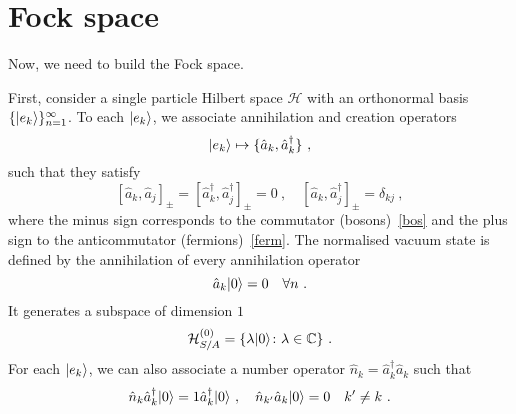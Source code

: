 \section{Fock space}

    Now, we need to build the Fock space. 
    
    First, consider a single particle Hilbert space $\mathcal H$ with an orthonormal basis $\{\vert e_k\rangle\}_{n=1}^\infty$. To each $\vert e_k\rangle$, we associate annihilation and creation operators
    \begin{equation*}
        \vert e_k\rangle \mapsto \{\hat a_k, \hat a_k^\dagger\} ~,
    \end{equation*}
    such that they satisfy
    \begin{equation}\label{comm}
        [\hat a_k, \hat a_j]_\pm = [\hat a_k^\dagger, \hat a_j^\dagger]_\pm = 0 ~, \quad [\hat a_k, \hat a_j^\dagger]_\pm = \delta_{kj} ~,
    \end{equation}
    where the minus sign corresponds to the commutator (bosons)~\eqref{bos} and the plus sign to the anticommutator (fermions)~\eqref{ferm}. The normalised vacuum state is defined by the annihilation of every annihilation operator
    \begin{equation*}
        \hat a_k \vert0\rangle = 0 \quad \forall n~.
    \end{equation*}
    It generates a subspace of dimension $1$ 
    \begin{equation}\label{vac}
        \mathcal H^{(0)}_{S/A} = \{\lambda \vert0\rangle \colon \lambda \in \mathbb C \} ~.
    \end{equation}
    For each $\vert e_k\rangle$, we can also associate a number operator $\hat n_k = \hat a_k^\dagger \hat a_k$ such that 
    \begin{equation*}
        \hat n_k \hat a_k^\dagger \vert0\rangle = 1 \hat a_k^\dagger \vert0\rangle ~, \quad \hat n_{k'} \hat a_k \vert0\rangle = 0 \quad k' \neq k ~.
    \end{equation*}

